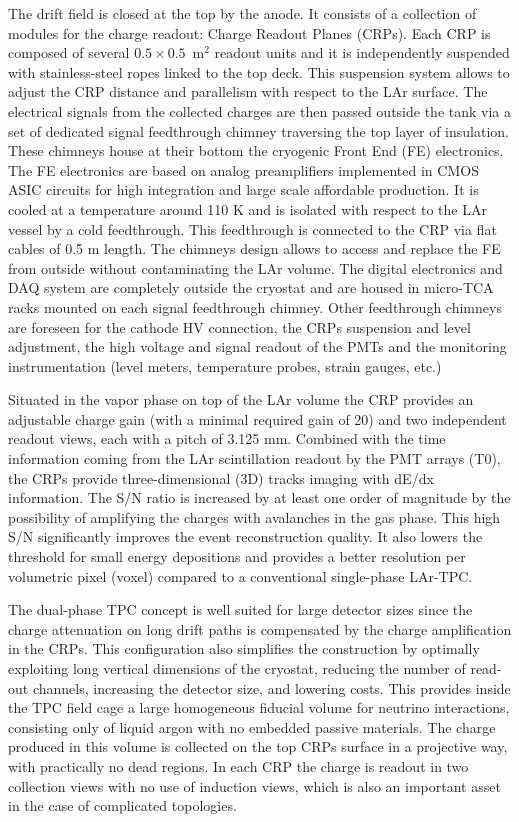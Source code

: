 The drift field is closed at the top by the anode. It consists of a collection of modules for the charge readout: Charge Readout Planes (CRPs). Each CRP is composed of several  $0.5\times 0.5$~m$^2$ readout units and it is independently suspended with stainless-steel ropes linked to the top deck. This suspension system allows to adjust the CRP distance and parallelism with respect to the LAr surface. The electrical signals from the collected charges are then passed outside the tank via a set of dedicated signal feedthrough chimney traversing the top layer of insulation. These chimneys house at their bottom the cryogenic  Front End (FE) electronics.  The FE electronics are based on analog preamplifiers implemented in CMOS ASIC circuits for high integration and large scale affordable production. It  is cooled at a temperature around 110 K and is isolated with respect to the LAr vessel by a cold feedthrough. This feedthrough is  connected to the CRP via flat cables of 0.5 m length. The chimneys design allows to access and replace the FE from outside without contaminating the LAr volume. The digital electronics and DAQ system are completely outside the cryostat and are housed in micro-TCA racks mounted on each signal feedthrough chimney. Other feedthrough chimneys are foreseen for the cathode HV connection, the CRPs suspension and level adjustment, the high voltage and signal readout of the PMTs and the monitoring instrumentation (level meters, temperature probes, strain gauges, etc.)

Situated in the vapor phase on top of the LAr volume the CRP  provides an adjustable charge gain (with a minimal required gain of 20) and two independent readout views, each with a pitch of 3.125 mm.  Combined with the time information coming from the LAr scintillation readout by the PMT arrays (T0), the CRPs provide three-dimensional (3D) tracks imaging with dE/dx information. The S/N ratio is increased by at least one order of magnitude by the possibility of amplifying the charges with avalanches in the gas phase.  This high S/N significantly improves the event reconstruction quality. It also lowers the threshold for small energy depositions and provides a better resolution per volumetric pixel (voxel) compared to a conventional single-phase LAr-TPC. 

The dual-phase TPC concept is well suited for large detector sizes since the charge attenuation on long drift paths is compensated by the charge amplification in the CRPs.  This configuration also simplifies the construction by optimally exploiting long vertical dimensions of the cryostat, reducing the number of read-out channels, increasing the detector size, and lowering costs.  This provides inside the TPC field cage a large homogeneous fiducial volume for neutrino interactions, consisting only of liquid argon with no embedded passive materials. The charge produced in this volume is collected on the top CRPs surface in a projective way, with practically no dead regions. In each CRP the charge is readout in two collection views with no use of induction views, which is also an important asset in the case of complicated topologies. 

